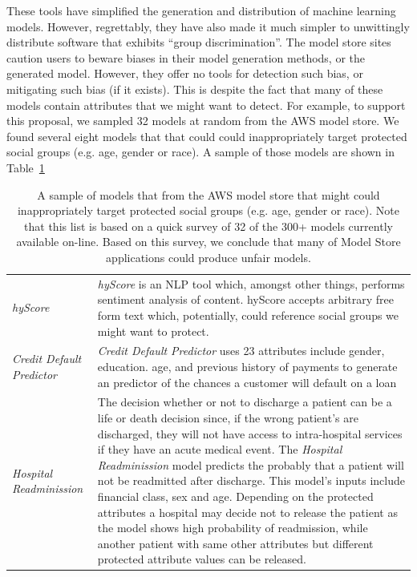 \documentclass{NSF}
\newcommand{\tbl}[1]{Table~\ref{tbl:#1}}
\begin{document}
\begin{nsfdescription}
These tools have simplified the generation and distribution of machine learning models.
However, regrettably, they have also made it much simpler to 
unwittingly  distribute  software that exhibits
``group discrimination''.  The model store sites caution
users to beware biases in their model generation methods, or the generated model. However, they offer no tools for detection   such bias, or mitigating such bias (if it exists). This is despite the fact
that many of these models contain attributes that we might want to detect.
For example, to support this proposal, we sampled 32 models at random from
the AWS model store. We found several eight models that  that could could inappropriately target protected social groups (e.g. age, gender or race). A sample of those models are shown in \tbl{msample}
\begin{table}
\small
\begin{tabular}{|p{0.8in}|p{5.4in}|}\hline
\rowcolor{gray!20}
 {\em hyScore} & {\em hyScore} is an NLP tool which, amongst other things, performs  sentiment analysis of content. hyScore accepts arbitrary free form text which, potentially, could reference   social groups we might want to protect.
 \\ 
 {\em  Credit Default Predictor} &{\em Credit Default Predictor} uses   23 attributes include gender, education. age, and previous history of payments to generate an   predictor of the chances a customer will default on a loan
 \\
\rowcolor{gray!20}
{\em Hospital Readminission} &
The decision whether or not to discharge a patient can be a life or
death decision since, if the wrong patient's are discharged, they
will not have access to   intra-hospital services if they have an acute medical event. The {\em Hospital Readminission} model predicts the probably that a patient will not be readmitted after discharge. This model's inputs include financial class, sex and age. Depending on the protected attributes a hospital may decide not to release the patient as the model shows high probability of readmission, while another patient with same other attributes but different protected attribute values can be released.
\\
\hline
\end{tabular}
\caption{A sample of models that from the AWS model store
that might  could inappropriately target protected social groups (e.g. age, gender or race). Note that this list is based on a quick survey
of 32 of the 300+ models currently available on-line.
Based on this survey, we conclude that many of Model Store
applications could produce unfair models.}\label{tbl:msample}
\end{table}



\end{nsfdescription}
\end{document}
